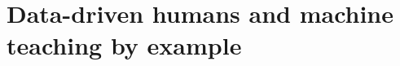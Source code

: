 \documentclass[justified]{tufte-handout}
\begin{document}




\section{Data-driven humans and machine teaching by example}
\end{document}
